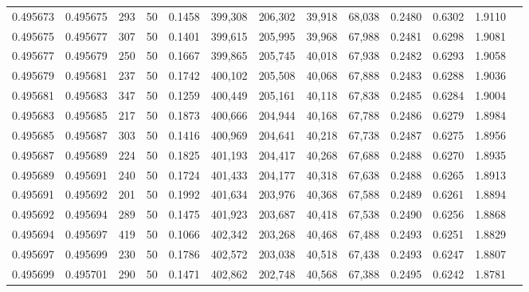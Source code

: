 \begin{tabular}{rrrrrrrrrrrrr}
0.495673 & 0.495675 &   293 &  50 &                                     0.1458 & 399,308 & 206,302 &  39,918 &  68,038 & 0.2480 & 0.6302 & 1.9110 \\
0.495675 & 0.495677 &   307 &  50 &                                     0.1401 & 399,615 & 205,995 &  39,968 &  67,988 & 0.2481 & 0.6298 & 1.9081 \\
0.495677 & 0.495679 &   250 &  50 &                                     0.1667 & 399,865 & 205,745 &  40,018 &  67,938 & 0.2482 & 0.6293 & 1.9058 \\
0.495679 & 0.495681 &   237 &  50 &                                     0.1742 & 400,102 & 205,508 &  40,068 &  67,888 & 0.2483 & 0.6288 & 1.9036 \\
0.495681 & 0.495683 &   347 &  50 &                                     0.1259 & 400,449 & 205,161 &  40,118 &  67,838 & 0.2485 & 0.6284 & 1.9004 \\
0.495683 & 0.495685 &   217 &  50 &                                     0.1873 & 400,666 & 204,944 &  40,168 &  67,788 & 0.2486 & 0.6279 & 1.8984 \\
0.495685 & 0.495687 &   303 &  50 &                                     0.1416 & 400,969 & 204,641 &  40,218 &  67,738 & 0.2487 & 0.6275 & 1.8956 \\
0.495687 & 0.495689 &   224 &  50 &                                     0.1825 & 401,193 & 204,417 &  40,268 &  67,688 & 0.2488 & 0.6270 & 1.8935 \\
0.495689 & 0.495691 &   240 &  50 &                                     0.1724 & 401,433 & 204,177 &  40,318 &  67,638 & 0.2488 & 0.6265 & 1.8913 \\
0.495691 & 0.495692 &   201 &  50 &                                     0.1992 & 401,634 & 203,976 &  40,368 &  67,588 & 0.2489 & 0.6261 & 1.8894 \\
0.495692 & 0.495694 &   289 &  50 &                                     0.1475 & 401,923 & 203,687 &  40,418 &  67,538 & 0.2490 & 0.6256 & 1.8868 \\
0.495694 & 0.495697 &   419 &  50 &                                     0.1066 & 402,342 & 203,268 &  40,468 &  67,488 & 0.2493 & 0.6251 & 1.8829 \\
0.495697 & 0.495699 &   230 &  50 &                                     0.1786 & 402,572 & 203,038 &  40,518 &  67,438 & 0.2493 & 0.6247 & 1.8807 \\
0.495699 & 0.495701 &   290 &  50 &                                     0.1471 & 402,862 & 202,748 &  40,568 &  67,388 & 0.2495 & 0.6242 & 1.8781 \\

\end{tabular}
